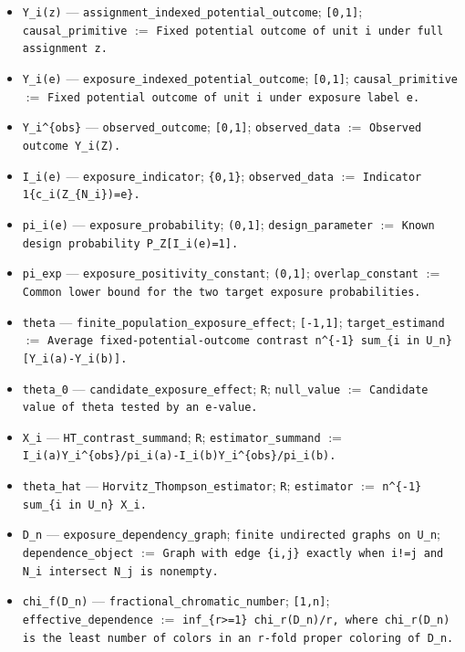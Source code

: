 \documentclass{article}
\begin{document}
\begin{itemize}
  \item \texttt{Y\_i(z)} --- \texttt{assignment\_indexed\_potential\_outcome}; \texttt{[0,1]}; \texttt{causal\_primitive} $:=$ \texttt{Fixed potential outcome of unit i under full assignment z.}
  \item \texttt{Y\_i(e)} --- \texttt{exposure\_indexed\_potential\_outcome}; \texttt{[0,1]}; \texttt{causal\_primitive} $:=$ \texttt{Fixed potential outcome of unit i under exposure label e.}
  \item \texttt{Y\_i\textasciicircum{}\{obs\}} --- \texttt{observed\_outcome}; \texttt{[0,1]}; \texttt{observed\_data} $:=$ \texttt{Observed outcome Y\_i(Z).}
  \item \texttt{I\_i(e)} --- \texttt{exposure\_indicator}; \texttt{\{0,1\}}; \texttt{observed\_data} $:=$ \texttt{Indicator 1\{c\_i(Z\_\{N\_i\})=e\}.}
  \item \texttt{pi\_i(e)} --- \texttt{exposure\_probability}; \texttt{(0,1]}; \texttt{design\_parameter} $:=$ \texttt{Known design probability P\_Z[I\_i(e)=1].}
  \item \texttt{pi\_exp} --- \texttt{exposure\_positivity\_constant}; \texttt{(0,1]}; \texttt{overlap\_constant} $:=$ \texttt{Common lower bound for the two target exposure probabilities.}
  \item \texttt{theta} --- \texttt{finite\_population\_exposure\_effect}; \texttt{[-1,1]}; \texttt{target\_estimand} $:=$ \texttt{Average fixed-potential-outcome contrast n\textasciicircum{}\{-1\} sum\_\{i in U\_n\}[Y\_i(a)-Y\_i(b)].}
  \item \texttt{theta\_0} --- \texttt{candidate\_exposure\_effect}; \texttt{R}; \texttt{null\_value} $:=$ \texttt{Candidate value of theta tested by an e-value.}
  \item \texttt{X\_i} --- \texttt{HT\_contrast\_summand}; \texttt{R}; \texttt{estimator\_summand} $:=$ \texttt{I\_i(a)Y\_i\textasciicircum{}\{obs\}/pi\_i(a)-I\_i(b)Y\_i\textasciicircum{}\{obs\}/pi\_i(b).}
  \item \texttt{theta\_hat} --- \texttt{Horvitz\_Thompson\_estimator}; \texttt{R}; \texttt{estimator} $:=$ \texttt{n\textasciicircum{}\{-1\} sum\_\{i in U\_n\} X\_i.}
  \item \texttt{D\_n} --- \texttt{exposure\_dependency\_graph}; \texttt{finite undirected graphs on U\_n}; \texttt{dependence\_object} $:=$ \texttt{Graph with edge \{i,j\} exactly when i!=j and N\_i intersect N\_j is nonempty.}
  \item \texttt{chi\_f(D\_n)} --- \texttt{fractional\_chromatic\_number}; \texttt{[1,n]}; \texttt{effective\_dependence} $:=$ \texttt{inf\_\{r>=1\} chi\_r(D\_n)/r, where chi\_r(D\_n) is the least number of colors in an r-fold proper coloring of D\_n.}

\end{itemize}
\end{document}

